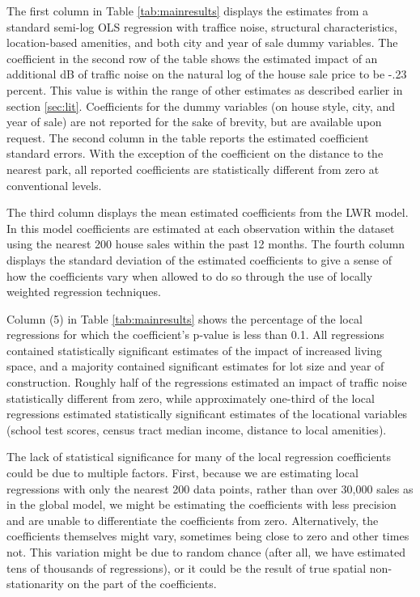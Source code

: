 \documentclass{article}\usepackage{graphicx, color}
\begin{document}
The first column in Table \ref{tab:mainresults} displays the estimates from a standard semi-log OLS regression with traffice noise, structural characteristics, location-based amenities, and both city and year of sale dummy variables. The coefficient in the second row of the table shows the estimated impact of an additional dB of traffic noise on the natural log of the house sale price to be -.23 percent. This value is within the range of other estimates as described earlier in section \ref{sec:lit}. Coefficients for the dummy variables (on house style, city, and year of sale) are not reported for the sake of brevity, but are available upon request. The second column in the table reports the estimated coefficient standard errors. With the exception of the coefficient on the distance to the nearest park, all reported coefficients are statistically different from zero at conventional levels. 

The third column displays the mean estimated coefficients from the LWR model. In this model coefficients are estimated at each observation within the dataset using the nearest 200 house sales within the past 12 months. The fourth column displays the standard deviation of the estimated coefficients to give a sense of how the coefficients vary when allowed to do so through the use of locally weighted regression techniques.

Column (5) in Table \ref{tab:mainresults} shows the percentage of the local regressions for which the coefficient's p-value is less than 0.1. All regressions contained statistically significant estimates of the impact of increased living space, and a majority contained significant estimates for lot size and year of construction. Roughly half of the regressions estimated an impact of traffic noise statistically different from zero, while approximately one-third of the local regressions estimated statistically significant estimates of the locational variables (school test scores, census tract median income, distance to local amenities).

The lack of statistical significance for many of the local regression coefficients could be due to multiple factors. First, because we are estimating local regressions with only the nearest 200 data points, rather than over 30,000 sales as in the global model, we might be estimating the coefficients with less precision and are unable to differentiate the coefficients from zero. Alternatively, the coefficients themselves might vary, sometimes being close to zero and other times not. This variation might be due to random chance (after all, we have estimated tens of thousands of regressions), or it could be the result of true spatial non-stationarity on the part of the coefficients. 
\end{document}
